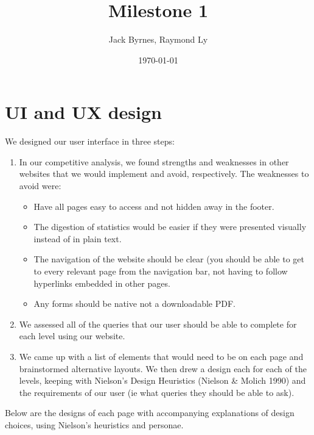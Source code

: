 \documentclass[12pt, a4paper]{article}
\title{Milestone 1}
\author{Jack Byrnes, Raymond Ly}
\date{\today}
\begin{document}
\maketitle
\tableofcontents
\section{UI and UX design}
We designed our user interface in three steps:
\begin{enumerate}
\item In our competitive analysis, we found strengths and weaknesses in other websites that we would implement and avoid, respectively. 
The weaknesses to avoid were:
\begin{itemize}
\item Have all pages easy to access and not hidden away in the footer. 
\item The digestion of statistics would be easier if they were presented visually instead of in plain text. 
\item The navigation of the website should be clear (you should be able to get to every relevant page from the navigation bar, not having to follow hyperlinks embedded in other pages. 
\item Any forms should be native not a downloadable PDF. 
\end{itemize}
\item We assessed all of the queries that our user should be able to complete for each level using our website.
\item We came up with a list of elements that would need to be on each page and brainstormed alternative layouts. We then drew a design each for each of the levels, keeping with Nielson's Design Heuristics (Nielson \& Molich 1990) and the requirements of our user (ie what queries they should be able to ask).
\end{enumerate}
Below are the designs of each page with accompanying explanations of design choices, using Nielson's heuristics and personae.
\end{document}
